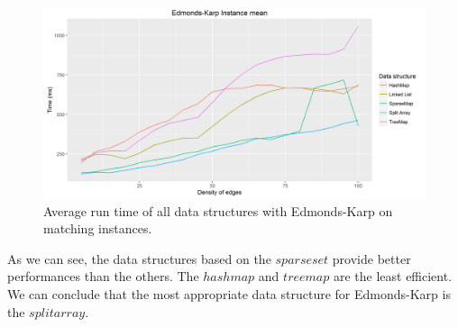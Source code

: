 \begin{figure}[H]
\begin{center}
\includegraphics[scale=0.5]{images/ekmeanmatching2.png}
\caption{Average run time of all data structures with Edmonds-Karp on matching instances.}
\label{fig:ekmeanmatching}
\end{center}
\end{figure}
As we can see, the data structures based on the $sparse set$ provide better performances than the others. The $hash map$ and $tree map$ are the least efficient. We can conclude that the most appropriate data structure for Edmonds-Karp is the $split array$.
